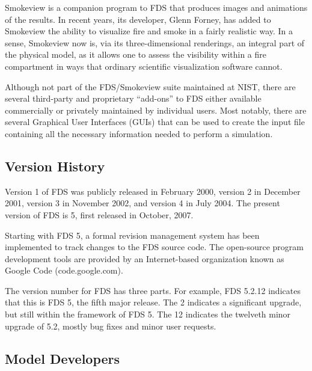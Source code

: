 \documentclass[11pt]{book}
\begin{document}
Smokeview is a companion program to FDS that produces images and animations of the results. In recent years, its developer, Glenn Forney, has
added to Smokeview the ability to visualize fire and smoke in a fairly realistic way. In a sense, Smokeview now is, via its three-dimensional
renderings, an integral part of the physical model, as it allows one to assess the visibility within a fire compartment in ways that ordinary
scientific visualization software cannot.

Although not part of the FDS/Smokeview suite maintained at NIST, there are several third-party and proprietary ``add-ons'' to FDS either available
commercially or privately maintained by individual users. Most notably, there are several Graphical User Interfaces (GUIs) that can be used
to create the input file containing all the necessary information needed to perform a simulation.



\subsection{Version History}

Version 1 of FDS was publicly released in February 2000, version 2 in December 2001, version 3 in November 2002, and version 4 in July 2004. The
present version of FDS is 5, first released in October, 2007.

Starting with FDS 5, a formal revision management system has been implemented to track changes to the FDS source code. The open-source program
development tools are provided by an Internet-based organization known as Google Code (code.google.com).

The version number for FDS has three parts.  For example, FDS 5.2.12 indicates that this is FDS 5, the fifth major release. The 2 indicates a
significant upgrade, but still within the framework of FDS 5.  The 12 indicates the twelveth minor upgrade of 5.2, mostly bug fixes and minor user
requests.


\subsection{Model Developers}
\end{document}
